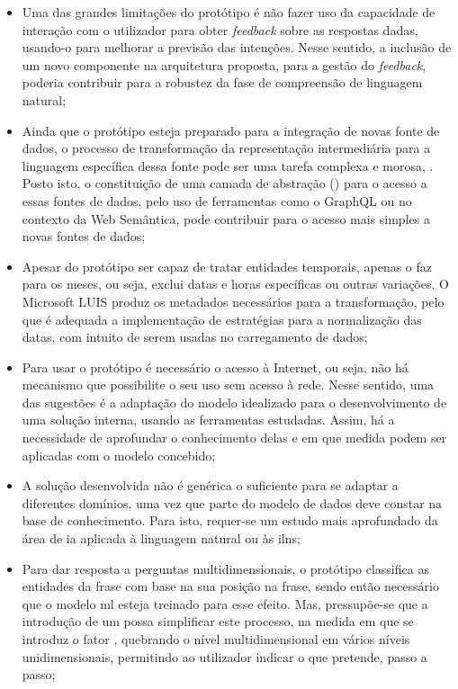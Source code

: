 \begin{itemize}
    \item 
    {
        Uma das grandes limitações do protótipo é não fazer uso da capacidade de interação com o utilizador para obter \textit{feedback} sobre as respostas dadas, usando-o para melhorar a previsão das intenções. Nesse sentido, a inclusão de um novo componente na arquitetura proposta, para a gestão do \textit{feedback}, poderia contribuir para a robustez da fase de compreensão de linguagem natural;
    }
    \item
    {
        Ainda que o protótipo esteja preparado para a integração de novas fonte de dados, o processo de transformação da representação intermediária para a linguagem específica dessa fonte pode ser uma tarefa complexa e morosa, . Posto isto, o constituição de uma camada de abstração () para o acesso a essas fontes de dados, pelo uso de ferramentas como o GraphQL ou no contexto da Web Semântica, pode contribuir para o acesso mais simples a novas fontes de dados;
    }
    \item
    {
        Apesar do protótipo ser capaz de tratar entidades temporais, apenas o faz para os meses, ou seja, exclui datas e horas específicas ou outras variações. O Microsoft LUIS produz os metadados necessários para a transformação, pelo que é adequada a implementação de estratégias para a normalização das datas, com intuito de serem usadas no carregamento de dados;
    }
    \item
    {
        Para usar o protótipo é necessário o acesso à Internet, ou seja, não há mecanismo que possibilite o seu uso sem acesso à rede. Nesse sentido, uma das sugestões é a adaptação do modelo idealizado para o desenvolvimento de uma solução interna, usando as ferramentas estudadas. Assim, há a necessidade de aprofundar o conhecimento delas e em que medida podem ser aplicadas com o modelo concebido;
    }
    \item
    {
        A solução desenvolvida não é genérica o suficiente para se adaptar a diferentes domínios, uma vez que parte do modelo de dados deve constar na base de conhecimento. Para isto, requer-se um estudo mais aprofundado da área de \gls{ia} aplicada à linguagem natural ou às \glspl{iln};
    }
    \item
    {
        Para dar resposta a perguntas multidimensionais, o protótipo classifica as entidades da frase com base na sua posição na frase, sendo então necessário que o modelo \gls{ml} esteja treinado para esse efeito. Mas, pressupõe-se que a introdução de um  possa simplificar este processo, na medida em que se introduz o fator , quebrando o nível multidimensional em vários níveis unidimensionais, permitindo ao utilizador indicar o que pretende, passo a passo; 
}
\end{itemize}
